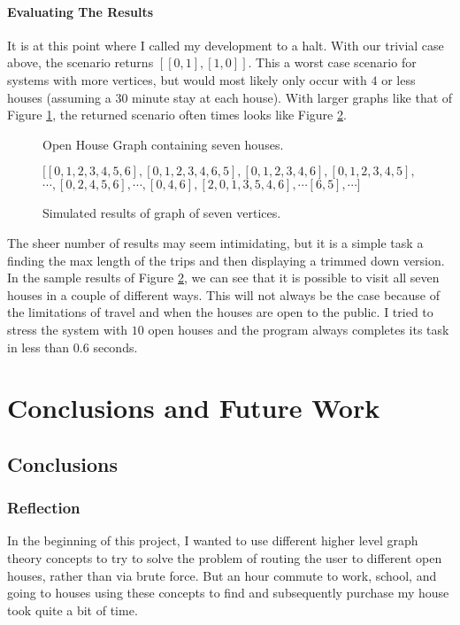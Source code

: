 \documentclass[letterpaper,11pt]{report}
\theoremstyle{definition}
\theoremstyle{definition}
\begin{document}
\subsubsection{Evaluating The Results}
It is at this point where I called my development to a halt. With our trivial case above, the scenario returns $[[0,1], [1,0]]$. This a worst case scenario for systems with more vertices, but would most likely only occur with $4$ or less houses (assuming a $30$ minute stay at each house). With larger graphs like that of Figure \ref{seven-houses}, the returned scenario often times looks like Figure \ref{seven-houses-results}.
\begin{figure}[!htb]
  \begin{center}
    
    \caption{Open House Graph containing seven houses.}\label{seven-houses}
  \end{center}
\end{figure}
\begin{figure}
  \begin{center}
    $[[0, 1, 2, 3, 4, 5, 6], [0, 1, 2, 3, 4, 6, 5], [0, 1, 2, 3, 4, 6], [0, 1, 2, 3, 4, 5],$\\ $\cdots, [0, 2, 4, 5, 6], \cdots, [0, 4, 6], [2, 0, 1, 3, 5, 4, 6], \cdots [6, 5], \cdots]$
  \end{center}
  \caption{Simulated results of graph of seven vertices.}\label{seven-houses-results}
\end{figure}

The sheer number of results may seem intimidating, but it is a simple task a finding the max length of the trips and then displaying a trimmed down version. In the sample results of Figure \ref{seven-houses-results}, we can see that it is possible to visit all seven houses in a couple of different ways. This will not always be the case because of the limitations of travel and when the houses are open to the public. I tried to stress the system with $10$ open houses and the program always completes its task in less than $0.6$ seconds.

\chapter{Conclusions and Future Work}
\section{Conclusions}
\subsection{Reflection}
In the beginning of this project, I wanted to use different higher level graph theory concepts to try to solve the problem of routing the user to different open houses, rather than via brute force. But an hour commute to work, school, and going to houses using these concepts to find and subsequently purchase my house took quite a bit of time. 
\end{document}
